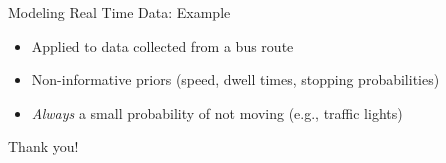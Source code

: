 \documentclass[10pt,t]{beamer}
\begin{document}
\begin{frame}{Modeling Real Time Data: Example}
  \begin{itemize}
    \item Applied to data collected from a bus route
    \item Non-informative priors (speed, dwell times, stopping probabilities)
    \item \emph{Always} a small probability of not moving (e.g., traffic lights)
  \end{itemize}
\end{frame}

{ %
    \begin{frame}[plain]
     \end{frame}
}





\begin{frame}[standout]
  Thank you!
\end{frame}
\end{document}
